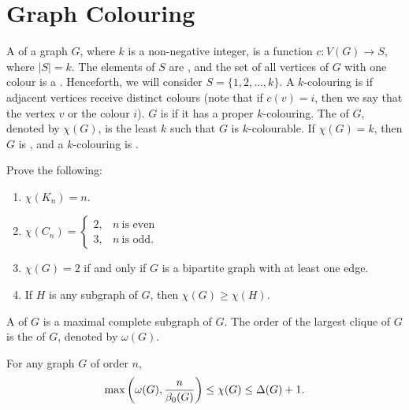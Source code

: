 \section{Graph Colouring}\label{sec:Colouring}

A  of a graph $G$, where $k$ is a non-negative integer, is a function $c \colon V(G) \to S$, where $|S| = k$. The elements of $S$ are , and the set of all vertices of $G$ with one colour is a . Henceforth, we will consider $S = \{1, 2, \ldots, k\}$. A $k$-colouring is  if adjacent vertices receive distinct colours (note that if $c(v) = i$, then we say that the vertex $v$  or  the colour $i$). $G$ is  if it has a proper $k$-colouring. The  of $G$, denoted by $\chi(G)$, is the least $k$ such that $G$ is $k$-colourable. If $\chi(G) = k$, then $G$ is , and a $k$-colouring is .

\begin{Exercise}
Prove the following:
\begin{enumerate}
\item $\chi(K_n) = n$.

\item $\chi(C_n) = \begin{cases}
2, & n\ \text{is even} \\
3, & n\ \text{is odd}.
\end{cases}$

\item $\chi(G) = 2$ if and only if $G$ is a bipartite graph with at least one edge.

\item If $H$ is any subgraph of $G$, then $\chi(G) \ge \chi(H)$.
\end{enumerate}
\end{Exercise}

A  of $G$ is a maximal complete subgraph of $G$. The order of the largest clique of $G$ is the  of $G$, denoted by $\omega(G)$.

\begin{Theorem}
For any graph $G$ of order $n$,
\begin{eqnarray}
\max\pqty{ \omega(G),  \frac n {\beta_0(G)} } \le \chi(G) \le \Delta(G) + 1.
\end{eqnarray}
\end{Theorem}

